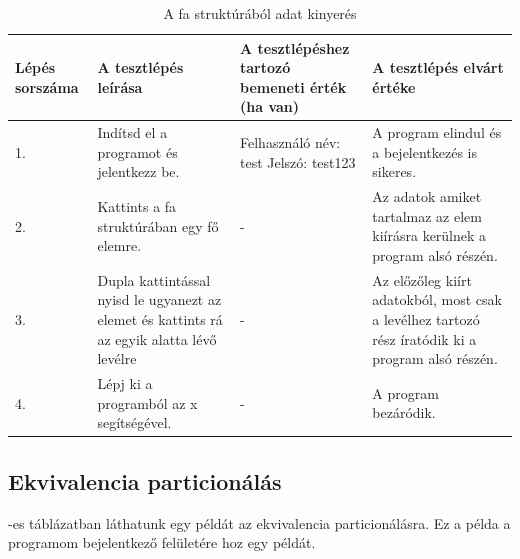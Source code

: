 \begin{table} [h]
	\begin{center}
		\caption{A fa struktúrából adat kinyerés}
		\label{table:jtree}
		\resizebox{\textwidth}{!} {
			\begin{tabular}{ |p{3cm}|p{5cm}|p{5cm}|p{5cm}| } 
				\hline
				Lépés sorszáma & A tesztlépés leírása & A tesztlépéshez tartozó bemeneti érték (ha van) & A tesztlépés elvárt értéke  \\ 
				\hline
				1. & Indítsd el a programot és jelentkezz be. & Felhasználó név: test \newline Jelszó: test123 & A program elindul és a bejelentkezés is sikeres.  \\ 
				\hline
				2. & Kattints a fa struktúrában egy fő elemre. & - & Az adatok amiket tartalmaz az elem kiírásra kerülnek a program alsó részén.\\ 
				\hline
				3. & Dupla kattintással nyisd le ugyanezt az elemet és kattints rá az egyik alatta lévő levélre & - & Az előzőleg kiírt adatokból, most csak a levélhez tartozó rész íratódik ki a program alsó részén. \\
				\hline
				4. & Lépj ki a programból az x segítségével. & - & A program bezáródik. \\
				\hline
			\end{tabular}
		}
	\end{center}

\end{table}

\subsection{Ekvivalencia particionálás} -es táblázatban láthatunk egy példát az ekvivalencia particionálásra. Ez a példa a programom bejelentkező felületére hoz egy példát.

